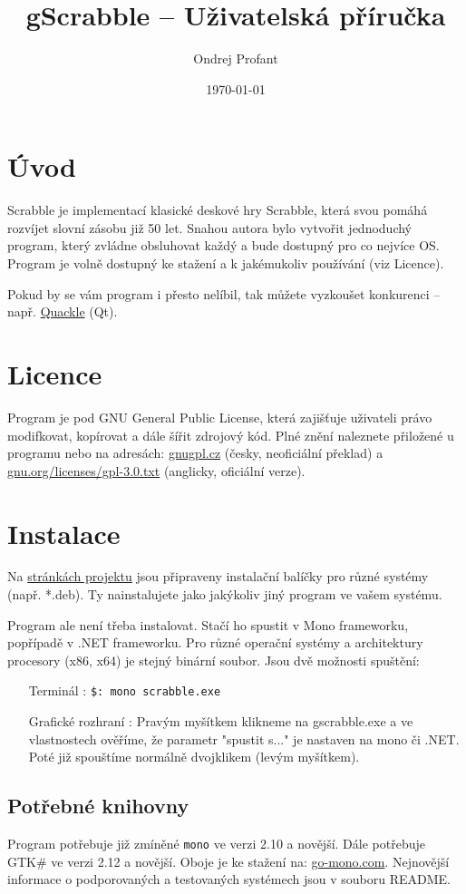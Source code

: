 \documentclass[a4paper]{article}
\title{gScrabble -- Uživatelská příručka}
\author{Ondrej Profant}
\date{\today}
\begin{document}
\tableofcontents	


\section{Úvod}
Scrabble je implementací klasické deskové hry Scrabble, která svou pomáhá rozvíjet slovní zásobu již 50 let. Snahou autora bylo vytvořit jednoduchý program, který zvládne obsluhovat každý a bude dostupný pro co nejvíce OS. Program je volně dostupný ke stažení a k jakémukoliv používání (viz Licence).

Pokud by se vám program i přesto nelíbil, tak můžete vyzkoušet konkurenci -- např. \href{http://people.csail.mit.edu/jasonkb/quackle/}{Quackle} (Qt).
\section{Licence}
Program je pod GNU General Public License, která zajišťuje uživateli právo modifkovat, kopírovat a dále šířit zdrojový kód. Plné znění naleznete přiložené u programu nebo na adresách:
\href{http://www.gnugpl.cz/}{gnugpl.cz} (česky, neoficiální překlad) a \href{http://www.gnu.org/licenses/gpl-3.0.txt}{gnu.org/licenses/gpl-3.0.txt} (anglicky, oficiální verze).

\section{Instalace}
Na \href{http://github.com/Kedrigern/scrabble/downloads}{stránkách projektu} jsou připraveny instalační balíčky pro různé systémy (např. *.deb). Ty nainstalujete jako jakýkoliv jiný program ve vašem systému.

Program ale není třeba instalovat. Stačí ho spustit v Mono frameworku, popřípadě v .NET frameworku. Pro různé operační systémy a architektury procesory (x86, x64) je stejný binární soubor.
Jsou dvě možnosti spuštění:
\begin{itemize}
\item[Terminál]: \texttt{\$: mono scrabble.exe} 
\item[Grafické rozhraní]: Pravým myšítkem klikneme na gscrabble.exe a ve vlastnostech ověříme, že parametr "spustit s..." je nastaven na mono či .NET. Poté již spouštíme normálně dvojklikem (levým myšítkem).
\end{itemize}
\subsection{Potřebné knihovny}
Program potřebuje již zmíněné \texttt{mono} ve verzi 2.10 a novější. Dále potřebuje GTK\# ve verzi 2.12 a novější. Oboje je ke stažení na: \href{http://www.go-mono.com/mono-downloads}{go-mono.com}. Nejnovější informace o podporovaných a testovaných systémech jsou v souboru README.
\end{document}
